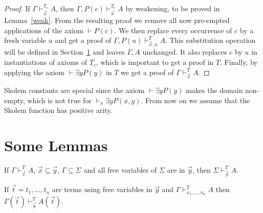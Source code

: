 \documentclass[10pt,a4paper]{article}
\begin{document}
\begin{proof}
If $\Gamma\vdash_{\vec{x}}^{T_c} A$, then $\Gamma,P(c)\vdash_{\vec{x}}^{T_c} A$
by weakening, to be proved in Lemma~\ref{weak}.
From the resulting proof we remove all now pre-empted applications of
the axiom $\vdash P(c)$. We then
replace every occurrence of $c$ by a fresh variable $u$ and 
get a proof of $\Gamma,P(u)\vdash_{\vec{x},u}^{T} A$.
This substitution operation will be defined in Section~\ref{auxlemmas}
and leaves $\Gamma,A$ unchanged.
It also replaces $c$ by $u$ in instantiations of axioms of $T_c$,
which is important to get a proof in $T$. Finally,
by applying the axiom $\vdash\exists y P(y)$ in $T$ 
we get a proof of $\Gamma\vdash_{\vec{x}}^{T} A$.
\end{proof}

Skolem constants are special since the axiom $\vdash\exists y P(y)$
makes the domain non-empty, which is not true for $\vdash_x\exists y P(x,y)$.
From now on we assume that the Skolem function has positive arity.

\section{Some Lemmas}\label{auxlemmas}


\begin{lemma}\label{weak}
If $\Gamma\vdash_{\vec{x}}^T A$, $\vec{x}\subseteq \vec{y}$, $\Gamma\subseteq \Sigma$ and all free variables of $\Sigma$ are in $\vec{y}$, then $\Sigma\vdash_{\vec{y}}^T A$.
\end{lemma}

\begin{lemma}\label{subst1}
If $\vec{t} = t_1,\dots,t_n$ are terms using free variables in $\vec{y}$ and
$\Gamma\vdash_{x_1,\dots,x_n}^T A$ then $\Gamma(\vec{t})\vdash_{\vec{y}}^T A(\vec{t})$.
\end{lemma}
\end{document}
